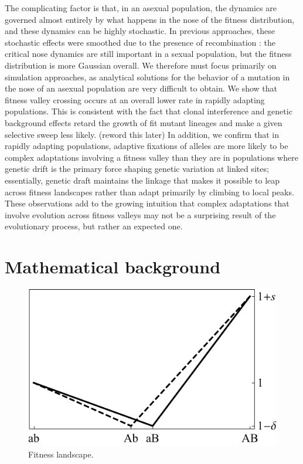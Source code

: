 \documentclass[rmp]{revtex4}
\begin{document}
\begin{spacing}{1.5}
The complicating factor is that, in an asexual population, the dynamics are governed almost entirely by what happens in the nose of the fitness distribution, and these dynamics can be highly stochastic.
In previous approaches, these stochastic effects were smoothed due to the presence of recombination \citep{neher_shraiman_2011, neher_shraiman_2009}: the critical nose dynamics are still important in a sexual population, but the fitness distribution is more Gaussian overall.
We therefore must focus primarily on simulation approaches, as analytical solutions for the behavior of a mutation in the nose of an asexual population are very difficult to obtain.
We show that fitness valley crossing occurs at an overall lower rate in rapidly adapting populations.
This is consistent with the fact that clonal interference and genetic background effects retard the growth of fit mutant lineages and make a given selective sweep less likely. (reword this later)
In addition, we confirm that in rapidly adapting populations, adaptive fixations of alleles are more likely to be complex adaptations involving a fitness valley than they are in populations where genetic drift is the primary force shaping genetic variation at linked sites; essentially, genetic draft maintains the linkage that makes it possible to leap across fitness landscapes rather than adapt primarily by climbing to local peaks.
These observations add to the growing intuition that complex adaptations that involve evolution across fitness valleys may not be a surprising result of the evolutionary process, but rather an expected one.

\section{Mathematical background}

\begin{figure}[t]
\begin{center}
  \includegraphics[scale=0.75]{Figures/valley.pdf}
  \caption{Fitness landscape.}
  \label{fig:landscape}
\end{center}
\end{figure}


\end{spacing}
\end{document}
